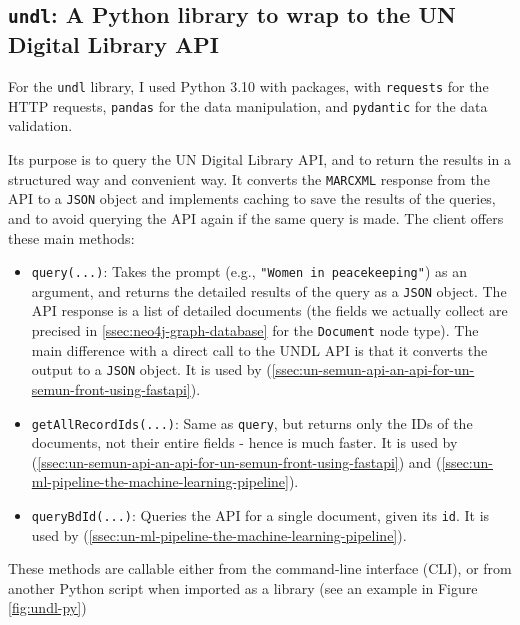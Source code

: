 \subsection{\texttt{undl}: A Python library to wrap to the UN Digital Library API} \label{ssec:undl-a-python-library-to-wrap-to-the-un-digital-library-api}

For the \texttt{undl} library, I used Python 3.10 with packages, with \texttt{requests} for the HTTP requests, \texttt{pandas} for the data manipulation, and \texttt{pydantic} for the data validation.

Its purpose is to query the UN Digital Library API, and to return the results in a structured way and convenient way. It converts the \texttt{MARCXML} response from the API to a \texttt{JSON} object and implements caching to save the results of the queries, and to avoid querying the API again if the same query is made. The client offers these main methods:

\begin{itemize}
    \item \texttt{query(...)}:
          Takes the prompt (e.g., \texttt{"Women in peacekeeping"}) as an argument, and returns the detailed results of the query as a \texttt{JSON} object. The API response is a list of detailed documents (the fields we actually collect are precised in \ref{ssec:neo4j-graph-database} for the \texttt{Document} node type).
          The main difference with a direct call to the UNDL API is that it converts the output to a \texttt{JSON} object. It is used by  (\ref{ssec:un-semun-api-an-api-for-un-semun-front-using-fastapi}).

    \item \texttt{getAllRecordIds(...)}:
          Same as \texttt{query}, but returns only the IDs of the documents, not their entire fields - hence is much faster. It is used by  (\ref{ssec:un-semun-api-an-api-for-un-semun-front-using-fastapi}) and  (\ref{ssec:un-ml-pipeline-the-machine-learning-pipeline}).

    \item \texttt{queryBdId(...)}:
          Queries the API for a single document, given its \texttt{id}. It is used by  (\ref{ssec:un-ml-pipeline-the-machine-learning-pipeline}).
\end{itemize}

These methods are callable either from the command-line interface (CLI), or from another Python script when imported as a library (see an example in Figure \ref{fig:undl-py})

